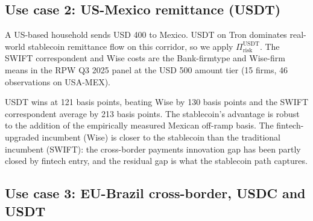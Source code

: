 \subsection{Use case 2: US-Mexico remittance (USDT)}\label{sub:us_mx}

A US-based household sends USD 400 to Mexico. USDT on Tron dominates real-world stablecoin remittance flow on this corridor, so we apply $\Pi_{\text{risk}}^{\text{USDT}}$. The SWIFT correspondent and Wise costs are the Bank-firmtype and Wise-firm means in the RPW Q3 2025 panel at the USD 500 amount tier (15 firms, 46 observations on USA-MEX).

\begin{table}[H]
\centering
\caption{Use case 2: US-Mexico remittance, USDT-on-Tron, transaction value USD 400. SWIFT correspondent and Wise figures are RPW Q3 2025 means; USDT total adds the Mexican peso off-ramp basis.}\label{tab:uc2}
\end{table}

USDT wins at 121 basis points, beating Wise by 130 basis points and the SWIFT correspondent average by 213 basis points. The stablecoin's advantage is robust to the addition of the empirically measured Mexican off-ramp basis. The fintech-upgraded incumbent (Wise) is closer to the stablecoin than the traditional incumbent (SWIFT): the cross-border payments innovation gap has been partly closed by fintech entry, and the residual gap is what the stablecoin path captures.

\subsection{Use case 3: EU-Brazil cross-border, USDC and USDT}\label{sub:eu_br}

